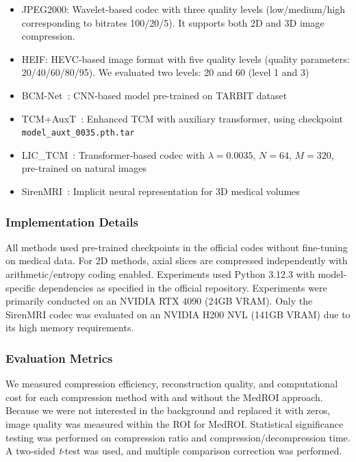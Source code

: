 \documentclass[runningheads]{llncs}
\begin{document}
\vspace{-0.2cm}
\begin{itemize} \item JPEG2000: Wavelet-based codec with three quality levels (low/medium/high corresponding to bitrates 100/20/5). It supports both 2D and 3D image compression.
\item HEIF: HEVC-based image format with five quality levels (quality parameters: 20/40/60/80/95). We evaluated two levels: 20 and 60 (level 1 and 3)
\end{itemize} 
\vspace{-0.11cm}

\vspace{-0.2cm}
\begin{itemize} 
\item BCM-Net~\cite{bcm}: CNN-based model pre-trained on TARBIT dataset 
\item TCM+AuxT~\cite{tcm+auxt}: Enhanced TCM with auxiliary transformer, using checkpoint \texttt{model\_auxt\_0035.pth.tar} 
\item LIC\_TCM~\cite{tcm}: Transformer-based codec with $\lambda=0.0035$, $N=64$, $M=320$, pre-trained on natural images 
\end{itemize} 
\vspace{-0.11cm}

\vspace{-0.2cm}
\begin{itemize} 
\item SirenMRI~\cite{siren}: Implicit neural representation for 3D medical volumes 
\end{itemize}


\subsubsection{Implementation Details}
All methods used pre-trained checkpoints in the official codes without fine-tuning on medical data. For 2D methods, axial slices are compressed independently with arithmetic/entropy coding enabled. Experiments used Python 3.12.3 with model-specific dependencies as specified in the official repository.
Experiments were primarily conducted on an NVIDIA RTX 4090 (24GB VRAM). Only the SirenMRI codec was evaluated on an NVIDIA H200 NVL (141GB VRAM) due to its high memory requirements.

\subsubsection{Evaluation Metrics}
We measured compression efficiency, reconstruction quality, and computational cost for each compression method with and without the MedROI approach. 
Because we were not interested in the background and replaced it with zeros, image quality was measured within the ROI for MedROI. Statistical significance testing was performed on compression ratio and compression/decompression time. A two-sided \textit{t}-test was used, and multiple comparison correction was performed.
\end{document}
